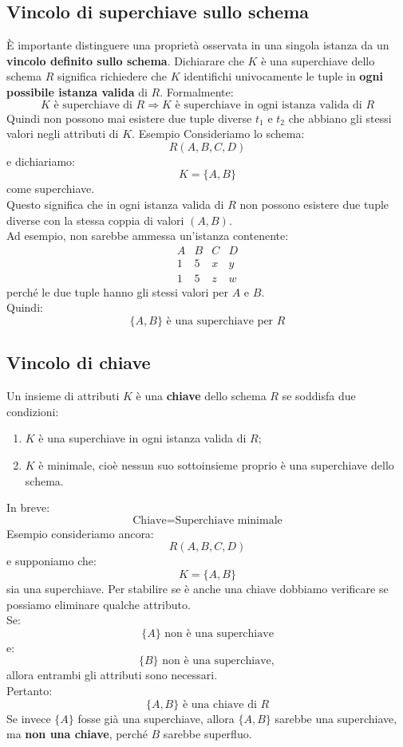 \subsection{Vincolo di superchiave sullo schema}
È importante distinguere una proprietà osservata in una singola istanza
da un \textbf{vincolo definito sullo schema}.
Dichiarare che $K$ è una superchiave dello schema $R$ significa richiedere
che $K$ identifichi univocamente le tuple in \textbf{ogni possibile
istanza valida} di $R$.
Formalmente:
\[
\boxed{
K \text{ è superchiave di } R
\Longrightarrow
K \text{ è superchiave in ogni istanza valida di } R
}
\]
Quindi non possono mai esistere due tuple diverse $t_1$ e $t_2$ che
abbiano gli stessi valori negli attributi di $K$.
\textcolor{verdeEsempio}{Esempio}
Consideriamo lo schema:
\[
R(A,B,C,D)
\]
e dichiariamo:
\[
K=\{A,B\}
\]
come superchiave.\\
Questo significa che in ogni istanza valida di $R$ non possono esistere
due tuple diverse con la stessa coppia di valori $(A,B)$.\\
Ad esempio, non sarebbe ammessa un'istanza contenente:
\[
\begin{array}{c|c|c|c}
A & B & C & D \\ \hline
1 & 5 & x & y \\
1 & 5 & z & w
\end{array}
\]
perché le due tuple hanno gli stessi valori per $A$ e $B$.\\
Quindi:
\[
\boxed{\{A,B\} \text{ è una superchiave per } R}
\]

\subsection{Vincolo di chiave}
Un insieme di attributi $K$ è una \textbf{chiave} dello schema $R$ se
soddisfa due condizioni:
\begin{enumerate}
    \item $K$ è una superchiave in ogni istanza valida di $R$;
    \item $K$ è minimale, cioè nessun suo sottoinsieme proprio è
    una superchiave dello schema.
\end{enumerate}
\noindent In breve:
\[
\boxed{
\text{Chiave} = \text{Superchiave minimale}
}
\]
\textcolor{verdeEsempio}{Esempio}
consideriamo ancora:
\[
R(A,B,C,D)
\]
e supponiamo che:
\[
K=\{A,B\}
\]
sia una superchiave.
Per stabilire se è anche una chiave dobbiamo verificare se possiamo
eliminare qualche attributo.\\
Se:
\[
\{A\} \text{ non è una superchiave}
\]
e:
\[
\{B\} \text{ non è una superchiave},
\]
allora entrambi gli attributi sono necessari.\\
Pertanto:
\[
\boxed{
\{A,B\} \text{ è una chiave di } R
}
\]
Se invece $\{A\}$ fosse già una superchiave, allora $\{A,B\}$ sarebbe
una superchiave, ma \textbf{non una chiave}, perché $B$ sarebbe
superfluo.

